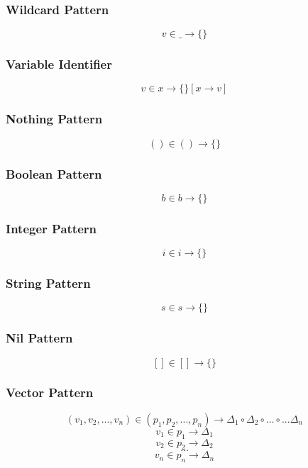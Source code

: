 \documentclass[titlepage]{article}
\begin{document}
\subsubsection{Wildcard Pattern}


$$v \in \_ \rightarrow \{\}$$


\subsubsection{Variable Identifier}
   
  
$$v \in x \rightarrow \{\}[x \rightarrow v]$$


\subsubsection{Nothing Pattern}


$$() \in () \rightarrow \{\}$$


\subsubsection{Boolean Pattern}


$$b \in b \rightarrow \{\}$$

\subsubsection{Integer Pattern}


$$i \in i \rightarrow \{\}$$


\subsubsection{String Pattern}


$$s \in s \rightarrow \{\}$$

\subsubsection{Nil Pattern}


$$[] \in [] \rightarrow \{\}$$



\subsubsection{Vector Pattern}


$$(v_1, v_2, ..., v_n) \in (p_1, p_2, ..., p_n) \rightarrow \Delta_1 \circ \Delta _2 \circ ... \circ ... \Delta_n$$
\noindent\makebox[\linewidth]{\rule{3.65in}{0.4pt}}
$$v_1 \in p_1 \rightarrow \Delta_1$$
$$v_2 \in p_2 \rightarrow \Delta_2$$
$$\dots$$
$$v_n \in p_n \rightarrow \Delta_n$$
\end{document}
